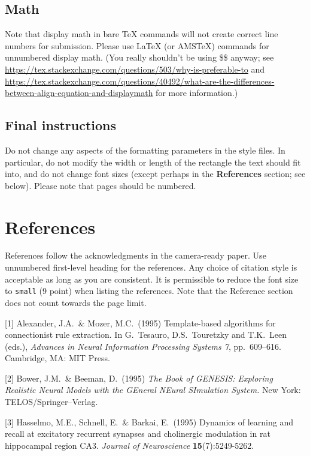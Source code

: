 \documentclass{article}
\begin{document}
\subsection{Math}
Note that display math in bare TeX commands will not create correct line numbers for submission. Please use LaTeX (or AMSTeX) commands for unnumbered display math. (You really shouldn't be using \$\$ anyway; see \url{https://tex.stackexchange.com/questions/503/why-is-preferable-to} and \url{https://tex.stackexchange.com/questions/40492/what-are-the-differences-between-align-equation-and-displaymath} for more information.)

\subsection{Final instructions}

Do not change any aspects of the formatting parameters in the style files.  In
particular, do not modify the width or length of the rectangle the text should
fit into, and do not change font sizes (except perhaps in the
\textbf{References} section; see below). Please note that pages should be
numbered.

\section*{References}


References follow the acknowledgments in the camera-ready paper. Use unnumbered first-level heading for
the references. Any choice of citation style is acceptable as long as you are
consistent. It is permissible to reduce the font size to \verb+small+ (9 point)
when listing the references.
Note that the Reference section does not count towards the page limit.
\medskip


{
\small


[1] Alexander, J.A.\ \& Mozer, M.C.\ (1995) Template-based algorithms for
connectionist rule extraction. In G.\ Tesauro, D.S.\ Touretzky and T.K.\ Leen
(eds.), {\it Advances in Neural Information Processing Systems 7},
pp.\ 609--616. Cambridge, MA: MIT Press.


    [2] Bower, J.M.\ \& Beeman, D.\ (1995) {\it The Book of GENESIS: Exploring
        Realistic Neural Models with the GEneral NEural SImulation System.}  New York:
TELOS/Springer--Verlag.


[3] Hasselmo, M.E., Schnell, E.\ \& Barkai, E.\ (1995) Dynamics of learning and
recall at excitatory recurrent synapses and cholinergic modulation in rat
hippocampal region CA3. {\it Journal of Neuroscience} {\bf 15}(7):5249-5262.
}
\end{document}
